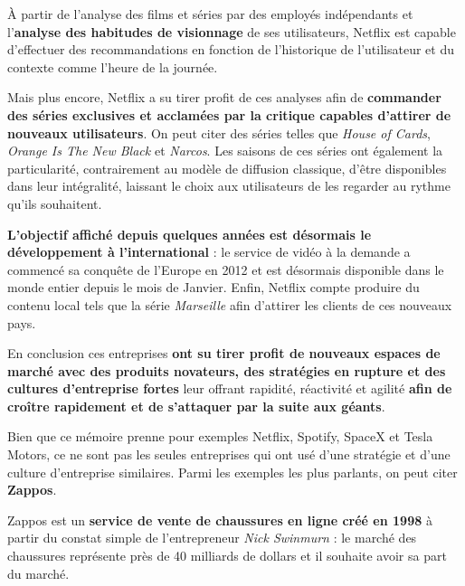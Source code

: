 À partir de l'analyse des films et séries par des employés indépendants et l'\textbf{analyse des habitudes de visionnage} de ses utilisateurs, Netflix est capable d'effectuer des recommandations en fonction de l'historique de l'utilisateur et du contexte comme l'heure de la journée\supercite{NetflixAlgorithm}.

Mais plus encore, Netflix a su tirer profit de ces analyses afin de \textbf{commander des séries exclusives et acclamées par la critique capables d'attirer de nouveaux utilisateurs}. On peut citer des séries telles que \textit{House of Cards}\supercite{HoCAwards}, \textit{Orange Is The New Black}\supercite{OitNBAwards} et \textit{Narcos}\supercite{NarcosAwards}. Les saisons de ces séries ont également la particularité, contrairement au modèle de diffusion classique, d'être disponibles dans leur intégralité, laissant le choix aux utilisateurs de les regarder au rythme qu'ils souhaitent.

\textbf{L'objectif affiché depuis quelques années est désormais le développement à l'international} : le service de vidéo à la demande a commencé sa conquête de l'Europe en 2012\supercite{NetflixEurope} et est désormais disponible dans le monde entier depuis le mois de Janvier\supercite{NetflixAvailableWorld}. Enfin, Netflix compte produire du contenu local tels que la série \textit{Marseille} afin d'attirer les clients de ces nouveaux pays\supercite{NetflixNumerama}.

\vspace{5mm}

En conclusion ces entreprises \textbf{ont su tirer profit de nouveaux espaces de marché avec des produits novateurs, des stratégies en rupture et des cultures d'entreprise fortes} leur offrant rapidité, réactivité et agilité \textbf{afin de croître rapidement et de s'attaquer par la suite aux géants}.

Bien que ce mémoire prenne pour exemples Netflix, Spotify, SpaceX et Tesla Motors, ce ne sont pas les seules entreprises qui ont usé d'une stratégie et d'une culture d'entreprise similaires. Parmi les exemples les plus parlants, on peut citer \textbf{Zappos}.

\vspace{5mm}

Zappos est un \textbf{service de vente de chaussures en ligne créé en 1998} à partir du constat simple de l'entrepreneur \textit{Nick Swinmurn} : le marché des chaussures représente près de 40 milliards de dollars et il souhaite avoir sa part du marché.

